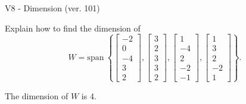 \begin{exercise}
  \begin{exerciseTitle}V8 - Dimension (ver. 101)\end{exerciseTitle}
  \begin{exerciseStatement}
    Explain how to find the dimension of 
\[W=\mathrm{span}\ \left\{\left[\begin{array}{r}
-2 \\
0 \\
-4 \\
3 \\
2
\end{array}\right] , \left[\begin{array}{r}
3 \\
2 \\
3 \\
3 \\
2
\end{array}\right] , \left[\begin{array}{r}
1 \\
-4 \\
2 \\
-2 \\
-1
\end{array}\right] , \left[\begin{array}{r}
1 \\
3 \\
2 \\
-2 \\
1
\end{array}\right]\right\}.\]



  \end{exerciseStatement}
  \begin{exerciseAnswer}
   The dimension of \(W\) is  \(4\).
  


  \end{exerciseAnswer}
\end{exercise}